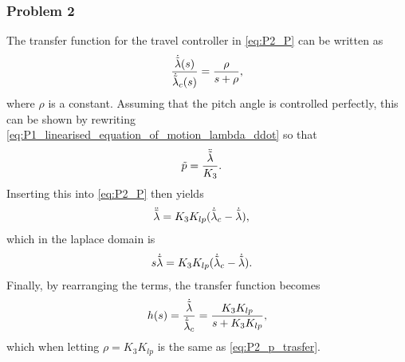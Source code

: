 \subsubsection{Problem 2}
The transfer function for the travel controller in \cref{eq:P2_P} can be written as
\begin{equation}
    \frac{\dot{\tilde{\lambda}}(s)}{\dot{\tilde{\lambda}}_c(s)} = \frac{\rho}{s + \rho}, 
    \label{eq:P2_p_trasfer}
\end{equation}
where $\rho$ is a constant. Assuming that the pitch angle is controlled perfectly, this can be shown by rewriting \cref{eq:P1_linearised_equation_of_motion_lambda_ddot} so that
\begin{align}
    \tilde{p} &= \frac{\ddot{\tilde{\lambda}}}{K_3} \label{eq:P2_p_to_lambda}.
\end{align}
Inserting this into \cref{eq:P2_P} then yields
\begin{align*}
    \ddot{\tilde{\lambda}} &= K_3 K_{lp} (\dot{\tilde{\lambda}}_c - \dot{\tilde{\lambda}}),
\end{align*}
which in the laplace domain is
\begin{align*}
    s\dot{\tilde{\lambda}} &= K_3 K_{lp} (\dot{\tilde{\lambda}}_c - \dot{\tilde{\lambda}}).
\end{align*}
Finally, by rearranging the terms, the transfer function becomes 
\begin{align}
    h(s) = \frac{\dot{\tilde{\lambda}}}{\dot{\tilde{\lambda}}_c} = \frac{K_3 K_{lp}}{s + K_3 K_{lp}},
\end{align}
which when letting $\rho = K_3 K_{lp}$ is the same as \cref{eq:P2_p_trasfer}.

